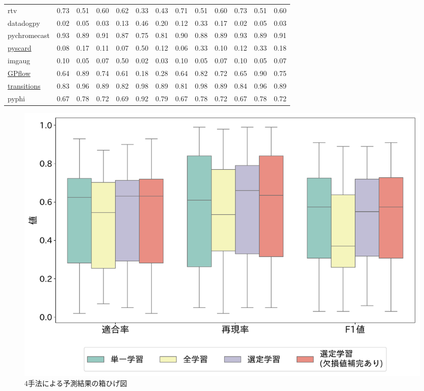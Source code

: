 \documentclass[paper]{ieicej}
\begin{document}
\begin{table}[t]
{\begin{tabular}{lcccccccccccc}
        rtv & 0.73 & 0.51 & 0.60 & 0.62 & 0.33 & 0.43 & 0.71 & 0.51 & 0.60 & 0.73 & 0.51 & 0.60 \\
        datadogpy & 0.02 & 0.05 & 0.03 & 0.13 & 0.46 & 0.20 & 0.12 & 0.33 & 0.17 & 0.02 & 0.05 & 0.03 \\
        pychromecast & 0.93 & 0.89 & 0.91 & 0.87 & 0.75 & 0.81 & 0.90 & 0.88 & 0.89 & 0.93 & 0.89 & 0.91 \\
        \underline{pyscard} & 0.08 & 0.17 & 0.11 & 0.07 & 0.50 & 0.12 & 0.06 & 0.33 & 0.10 & 0.12 & 0.33 & 0.18 \\
        imgaug & 0.10 & 0.05 & 0.07 & 0.50 & 0.02 & 0.03 & 0.10 & 0.05 & 0.07 & 0.10 & 0.05 & 0.07 \\
        \underline{GPflow} & 0.64 & 0.89 & 0.74 & 0.61 & 0.18 & 0.28 & 0.64 & 0.82 & 0.72 & 0.65 & 0.90 & 0.75 \\
        \underline{transitions} & 0.83 & 0.96 & 0.89 & 0.82 & 0.98 & 0.89 & 0.81 & 0.98 & 0.89 & 0.84 & 0.96 & 0.89 \\
        pyphi & 0.67 & 0.78 & 0.72 & 0.69 & 0.92 & 0.79 & 0.67 & 0.78 & 0.72 & 0.67 & 0.78 & 0.72 \\
    \bottomrule
  \end{tabular}
  }
\end{table}


\begin{figure}[t]
	\centering
	\includegraphics[width=1\linewidth]{fig/boxplot_unfiltered.pdf}
	\caption{4手法による予測結果の箱ひげ図}
	\label{fig:boxplot}
\end{figure}
\end{document}
